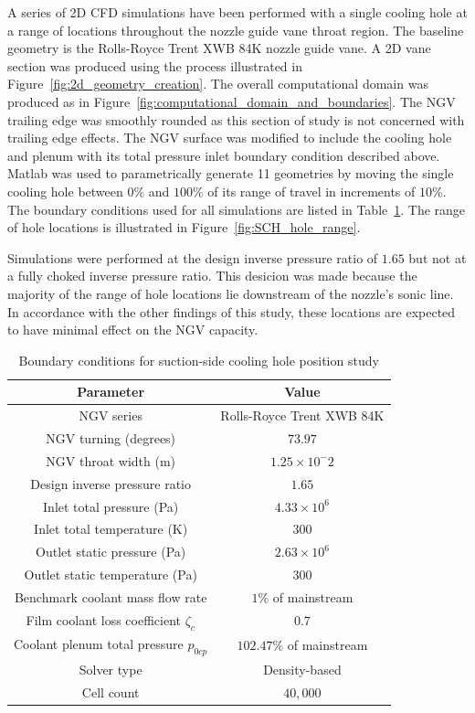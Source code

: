 \documentclass[a4paper, 11pt, oneside]{report}
\begin{document}
A series of 2D CFD simulations have been performed with a single cooling hole at a range of locations throughout the nozzle guide vane throat region. The baseline geometry is the Rolls-Royce Trent XWB 84K nozzle guide vane. A 2D vane section was produced using the process illustrated in Figure~\ref{fig:2d_geometry_creation}. The overall computational domain was produced as in Figure~\ref{fig:computational_domain_and_boundaries}. The NGV trailing edge was smoothly rounded as this section of study is not concerned with trailing edge effects. The NGV surface was modified to include the cooling hole and plenum with its total pressure inlet boundary condition described above. Matlab was used to parametrically generate 11 geometries by moving the single cooling hole between $0\%$ and $100\%$ of its range of travel in increments of $10\%$. The boundary conditions used for all simulations are listed in Table~\ref{SCH_parameters}. The range of hole locations is illustrated in Figure~\ref{fig:SCH_hole_range}.

Simulations were performed at the design inverse pressure ratio of $1.65$ but not at a fully choked inverse pressure ratio. This desicion was made because the majority of the range of hole locations lie downstream of the nozzle's sonic line. In accordance with the other findings of this study, these locations are expected to have minimal effect on the NGV capacity.

\begin{table}[H]
\caption{Boundary conditions for suction-side cooling hole position study}
\label{SCH_parameters}
\begin{center}
\begin{tabular}{|c|c|}
\hline
Parameter & Value\\
\hline
NGV series & Rolls-Royce Trent XWB 84K\\
NGV turning (degrees) & $73.97$\\
NGV throat width (m) & $1.25 \times 10^-2$\\
Design inverse pressure ratio & $1.65$\\
Inlet total pressure (Pa) & $4.33 \times 10^6$\\
Inlet total temperature (K) & $300$\\
Outlet static pressure (Pa) & $2.63 \times 10^6$\\
Outlet static temperature (Pa) & $300$\\
Benchmark coolant mass flow rate & $1\%$ of mainstream\\
Film coolant loss coefficient $\zeta_c$ & $0.7$\\
Coolant plenum total pressure $p_{0cp}$ & $102.47\%$ of mainstream\\
Solver type & Density-based\\
Cell count & $40,000$\\
\hline
\end{tabular}
\end{center}
\end{table}
\end{document}

